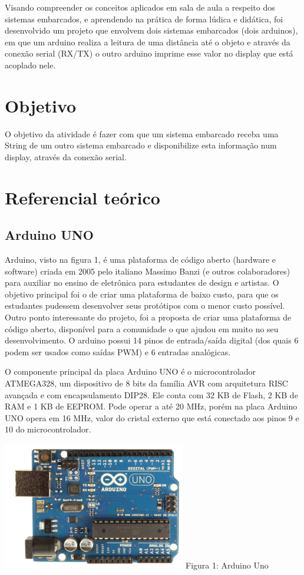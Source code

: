 \documentclass[conference]{IEEEtran}
\begin{document}
Visando compreender os conceitos aplicados em sala de aula a respeito dos sistemas embarcados, e aprendendo na prática de forma lúdica e didática, foi desenvolvido um projeto que envolvem dois sistemas embarcados (dois arduinos), em que um arduino realiza a leitura de uma distância até o objeto e através da conexão serial (RX/TX) o outro arduino imprime esse valor no display que está acoplado nele. 


\section{Objetivo }
O objetivo da atividade é fazer com que um sistema embarcado receba uma String de um outro sistema embarcado e disponibilize esta informação num display, através da conexão serial. 

\section{Referencial teórico}
\subsection{Arduino UNO}
Arduino, visto na figura 1, é uma plataforma de código aberto (hardware e software) criada em 2005 pelo italiano Massimo Banzi (e outros colaboradores) para auxiliar no ensino de eletrônica para estudantes de design e artistas. O objetivo principal foi o de criar uma plataforma de baixo custo, para que os estudantes pudessem desenvolver seus protótipos com o menor custo possível. Outro ponto interessante do projeto, foi a proposta de criar uma plataforma de código aberto, disponível para a comunidade o que ajudou em muito no seu desenvolvimento. O arduino possui 14 pinos de entrada/saída digital (dos quais 6 podem ser usados como saídas PWM) e 6 entradas analógicas.


O componente principal da placa Arduino UNO é o microcontrolador ATMEGA328, um dispositivo de 8 bits da família AVR com arquitetura RISC avançada e com encapsulamento DIP28. Ele conta com 32 KB de Flash, 2 KB de RAM e 1 KB de EEPROM. Pode operar a até 20 MHz, porém na placa Arduino UNO opera em 16 MHz, valor do cristal externo que está conectado aos pinos 9 e 10 do microcontrolador.
\begin{center}
    \includegraphics[width=8cm]{Arduino.png}
    Figura 1: Arduino Uno
\end{center}
\end{document}
